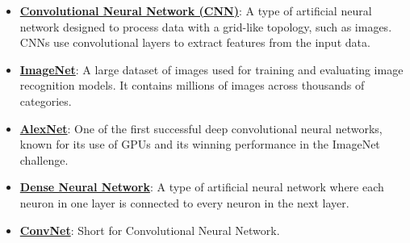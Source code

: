 \documentclass{article}%
\begin{document}
\begin{itemize}[leftmargin=*]%
\item \href{https://purdue.brightspace.com/d2l/common/assets/pdfjs-d2l-dist/1.0.14-legacy/web/viewer.html?file=\%2Fcontent\%2Fenforced\%2F1095467-wl.202510.CS.24300.001\%2F09L1-cnn.pdf\%3Fou\%3D1095467\&lang=en-us\&container=d2l-fileviewer-rendered-pdf\&fullscreen=d2l-fileviewer-rendered-pdf-dialog\&height=667#page=2}{\textbf{Convolutional Neural Network (CNN)}}: A type of artificial neural network designed to process data with a grid-like topology, such as images. CNNs use convolutional layers to extract features from the input data.%
\item \href{https://purdue.brightspace.com/d2l/common/assets/pdfjs-d2l-dist/1.0.14-legacy/web/viewer.html?file=\%2Fcontent\%2Fenforced\%2F1095467-wl.202510.CS.24300.001\%2F09L1-cnn.pdf\%3Fou\%3D1095467\&lang=en-us\&container=d2l-fileviewer-rendered-pdf\&fullscreen=d2l-fileviewer-rendered-pdf-dialog\&height=667#page=3}{\textbf{ImageNet}}: A large dataset of images used for training and evaluating image recognition models. It contains millions of images across thousands of categories.%
\item \href{https://purdue.brightspace.com/d2l/common/assets/pdfjs-d2l-dist/1.0.14-legacy/web/viewer.html?file=\%2Fcontent\%2Fenforced\%2F1095467-wl.202510.CS.24300.001\%2F09L1-cnn.pdf\%3Fou\%3D1095467\&lang=en-us\&container=d2l-fileviewer-rendered-pdf\&fullscreen=d2l-fileviewer-rendered-pdf-dialog\&height=667#page=3}{\textbf{AlexNet}}: One of the first successful deep convolutional neural networks, known for its use of GPUs and its winning performance in the ImageNet challenge.%
\item \href{https://purdue.brightspace.com/d2l/common/assets/pdfjs-d2l-dist/1.0.14-legacy/web/viewer.html?file=\%2Fcontent\%2Fenforced\%2F1095467-wl.202510.CS.24300.001\%2F09L1-cnn.pdf\%3Fou\%3D1095467\&lang=en-us\&container=d2l-fileviewer-rendered-pdf\&fullscreen=d2l-fileviewer-rendered-pdf-dialog\&height=667#page=4}{\textbf{Dense Neural Network}}: A type of artificial neural network where each neuron in one layer is connected to every neuron in the next layer.%
\item \href{https://purdue.brightspace.com/d2l/common/assets/pdfjs-d2l-dist/1.0.14-legacy/web/viewer.html?file=\%2Fcontent\%2Fenforced\%2F1095467-wl.202510.CS.24300.001\%2F09L1-cnn.pdf\%3Fou\%3D1095467\&lang=en-us\&container=d2l-fileviewer-rendered-pdf\&fullscreen=d2l-fileviewer-rendered-pdf-dialog\&height=667#page=4}{\textbf{ConvNet}}: Short for Convolutional Neural Network.%

\end{itemize}
\end{document}
